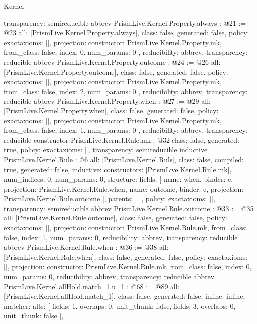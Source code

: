 \begin{lexlean}{Kernel}
\begin{coremodule}
{  transparency: semireducible
}
abbrev PrismLive.Kernel.Property.always : @21 := @23 {
  all: [PrismLive.Kernel.Property.always],
  class: false,
  generated: false,
  policy: exact{axioms: []},
  projection: {
    constructor: PrismLive.Kernel.Property.mk,
    from_class: false,
    index: 0,
    num_params: 0
  },
  reducibility: abbrev{},
  transparency: reducible
}
abbrev PrismLive.Kernel.Property.outcome : @24 := @26 {
  all: [PrismLive.Kernel.Property.outcome],
  class: false,
  generated: false,
  policy: exact{axioms: []},
  projection: {
    constructor: PrismLive.Kernel.Property.mk,
    from_class: false,
    index: 2,
    num_params: 0
  },
  reducibility: abbrev{},
  transparency: reducible
}
abbrev PrismLive.Kernel.Property.when : @27 := @29 {
  all: [PrismLive.Kernel.Property.when],
  class: false,
  generated: false,
  policy: exact{axioms: []},
  projection: {
    constructor: PrismLive.Kernel.Property.mk,
    from_class: false,
    index: 1,
    num_params: 0
  },
  reducibility: abbrev{},
  transparency: reducible
}
constructor PrismLive.Kernel.Rule.mk : @32 {
  class: false,
  generated: true,
  policy: exact{axioms: []},
  transparency: semireducible
}
inductive PrismLive.Kernel.Rule : @5 {
  all: [PrismLive.Kernel.Rule],
  class: false,
  compiled: true,
  generated: false,
  inductive: {
    constructors: [PrismLive.Kernel.Rule.mk],
    num_indices: 0,
    num_params: 0,
    structure: {
      fields: [
        {name: when, binder: e, projection: PrismLive.Kernel.Rule.when},
        {name: outcome, binder: e, projection: PrismLive.Kernel.Rule.outcome}
      ],
      parents: []
    }
  },
  policy: exact{axioms: []},
  transparency: semireducible
}
abbrev PrismLive.Kernel.Rule.outcome : @33 := @35 {
  all: [PrismLive.Kernel.Rule.outcome],
  class: false,
  generated: false,
  policy: exact{axioms: []},
  projection: {constructor: PrismLive.Kernel.Rule.mk, from_class: false, index: 1, num_params: 0},
  reducibility: abbrev{},
  transparency: reducible
}
abbrev PrismLive.Kernel.Rule.when : @36 := @38 {
  all: [PrismLive.Kernel.Rule.when],
  class: false,
  generated: false,
  policy: exact{axioms: []},
  projection: {constructor: PrismLive.Kernel.Rule.mk, from_class: false, index: 0, num_params: 0},
  reducibility: abbrev{},
  transparency: reducible
}
abbrev PrismLive.Kernel.allHold.match_1.{u_1} : @68 := @89 {
  all: [PrismLive.Kernel.allHold.match_1],
  class: false,
  generated: false,
  inline: inline,
  matcher: {
    alts: [
      {fields: 1, overlaps: 0, unit_thunk: false},
      {fields: 3, overlaps: 0, unit_thunk: false}
    ],
}}
\end{coremodule}
\end{lexlean}
